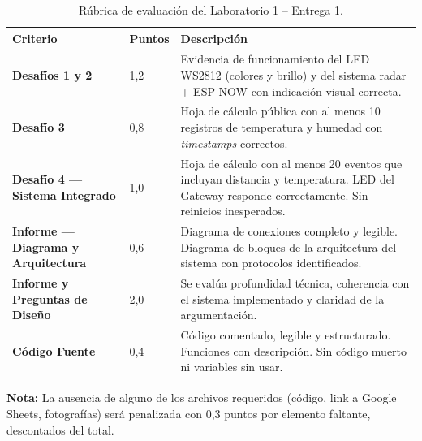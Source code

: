 \documentclass[12pt,leqno]{article}
\begin{document}
\begin{table}[h]
\centering
\begin{tabular}{|p{5.5cm}|p{1.5cm}|p{7cm}|}
\hline
\textbf{Criterio} & \textbf{Puntos} & \textbf{Descripci\'on} \\
\hline
\textbf{Desaf\'ios 1 y 2} & 1,2 & Evidencia de funcionamiento del LED WS2812
(colores y brillo) y del sistema radar + ESP-NOW con indicaci\'on visual correcta. \\
\hline
\textbf{Desaf\'io 3} & 0,8 & Hoja de c\'alculo p\'ublica con al menos 10 registros
de temperatura y humedad con \textit{timestamps} correctos. \\
\hline
\textbf{Desaf\'io 4 --- Sistema Integrado} & 1,0 & Hoja de c\'alculo con al menos
20 eventos que incluyan distancia y temperatura. LED del Gateway responde
correctamente. Sin reinicios inesperados. \\
\hline
\textbf{Informe --- Diagrama y Arquitectura} & 0,6 & Diagrama de conexiones completo
y legible. Diagrama de bloques de la arquitectura del sistema con protocolos
identificados. \\
\hline
\textbf{Informe y Preguntas de Dise\~no} & 2,0 & Se
eval\'ua profundidad t\'ecnica, coherencia con el sistema implementado y claridad de
la argumentaci\'on. \\
\hline
\textbf{C\'odigo Fuente} & 0,4 & C\'odigo comentado, legible y estructurado.
Funciones con descripci\'on. Sin c\'odigo muerto ni variables sin usar. \\
\hline
\end{tabular}
\caption{R\'ubrica de evaluaci\'on del Laboratorio 1 -- Entrega 1.}
\end{table}

\noindent\textbf{Nota:} La ausencia de alguno de los archivos requeridos (c\'odigo,
link a Google Sheets, fotograf\'ias) ser\'a penalizada con 0,3 puntos por elemento
faltante, descontados del total.
\end{document}

